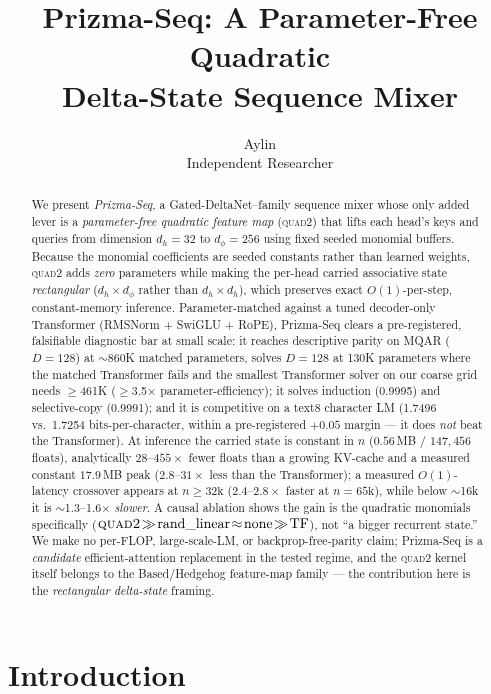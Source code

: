 \documentclass[11pt]{article}
\title{\textbf{Prizma-Seq: A Parameter-Free Quadratic\\ Delta-State Sequence Mixer}}
\author{Aylin\\ \small Independent Researcher}
\date{}
\newcommand{\dphi}{d_{\phi}}
\newcommand{\dhd}{d_{h}}
\newcommand{\quadtwo}{\textsc{quad2}}
\begin{document}
\maketitle

\begin{abstract}
We present \emph{Prizma-Seq}, a Gated-DeltaNet--family sequence mixer whose only added lever is
a \emph{parameter-free quadratic feature map} (\quadtwo) that lifts each head's keys and queries
from dimension $\dhd{=}32$ to $\dphi{=}256$ using fixed seeded monomial buffers. Because the
monomial coefficients are seeded constants rather than learned weights, \quadtwo{} adds
\emph{zero} parameters while making the per-head carried associative state \emph{rectangular}
($\dhd\times\dphi$ rather than $\dhd\times\dhd$), which preserves exact $O(1)$-per-step,
constant-memory inference. Parameter-matched against a tuned decoder-only Transformer
(RMSNorm + SwiGLU + RoPE), Prizma-Seq clears a pre-registered, falsifiable diagnostic bar at small
scale: it reaches descriptive parity on MQAR ($D{=}128$) at $\sim$860K matched parameters, solves
$D{=}128$ at 130K parameters where the matched Transformer fails and the smallest Transformer
solver on our coarse grid needs $\geq$461K ($\geq$3.5$\times$ parameter-efficiency); it solves
induction (0.9995) and selective-copy (0.9991); and it is competitive on a text8 character LM
(1.7496 vs.\ 1.7254 bits-per-character, within a pre-registered $+0.05$ margin --- it does
\emph{not} beat the Transformer). At inference the carried state is constant in $n$ ($0.56$\,MB / $147{,}456$ floats), analytically
$28$--$455\times$ fewer floats than a growing KV-cache and a measured constant $17.9$\,MB peak
($2.8$--$31\times$ less than the Transformer); a measured $O(1)$-latency crossover appears at
$n{\geq}32\text{k}$ ($2.4$--$2.8\times$ faster at $n{=}65\text{k}$), while below $\sim$16k it is
$\sim$1.3--1.6$\times$ \emph{slower}. A causal ablation shows the gain is the quadratic
monomials specifically ($\quadtwo\!\gg\!\text{rand\_linear}\!\approx\!\text{none}\!\gg\!\text{TF}$),
not ``a bigger recurrent state.'' We make no per-FLOP, large-scale-LM, or backprop-free-parity
claim; Prizma-Seq is a \emph{candidate} efficient-attention replacement in the tested regime, and
the \quadtwo{} kernel itself belongs to the Based/Hedgehog feature-map family --- the contribution
here is the \emph{rectangular delta-state} framing.
\end{abstract}

\section{Introduction}
\label{sec:intro}
\end{document}
